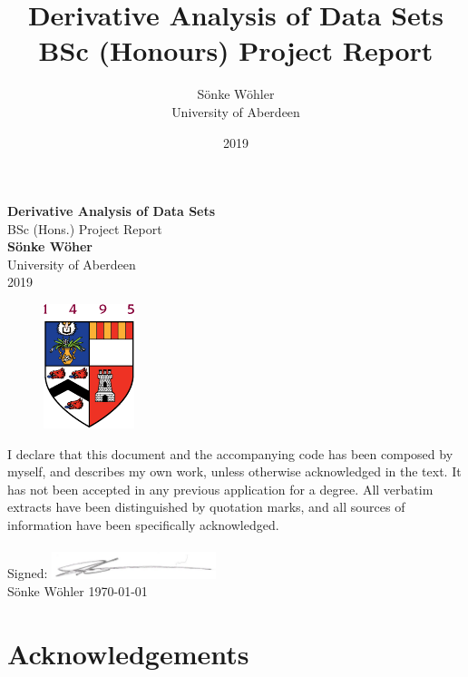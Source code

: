 \documentclass[11pt]{report}
\title{  Derivative Analysis of Data Sets \\
  \large BSc (Honours) Project Report
}
\author{S\"onke W\"ohler  \\
  University of Aberdeen }
\date{2019}
\begin{document}
  
  \begin{titlepage}
    \begin{center}
    \vspace*{2.0cm}

    \huge
    \textbf{Derivative Analysis of Data Sets} \\
    \LARGE
    BSc (Hons.) Project Report    \\
    \vspace{1.5cm}
    \Large
    \textbf{S\"onke W\"oher}\\
    \large
    University of Aberdeen     \\
    \vspace{1.5cm}
    2019
    
    
    \begin{figure}[h!]
      \centering
      \includegraphics{otherImages/abdnshield}
      \caption*{}
    \end{figure}
    
    \vfill
    \end{center}
    I declare that this document and the accompanying code has been composed by myself, and describes my own work, unless otherwise acknowledged in the text. It has not been accepted in any previous application for a degree. All verbatim extracts have been distinguished by quotation marks, and all sources of information have been specifically acknowledged.
    \\\\
    Signed: 
    \hfill \includegraphics[height=0.78cm]{otherImages/sonkiSignature}\hspace{2.5cm}
    \\
    S\"onke W\"ohler \hfil \today
  \end{titlepage} 
  
  \begingroup
    \fontsize{8pt}{10pt}\selectfont
  
      \lipsum[1]
  
  \endgroup
  \hrulefill
  
  \section*{Acknowledgements}
  
\end{document}
